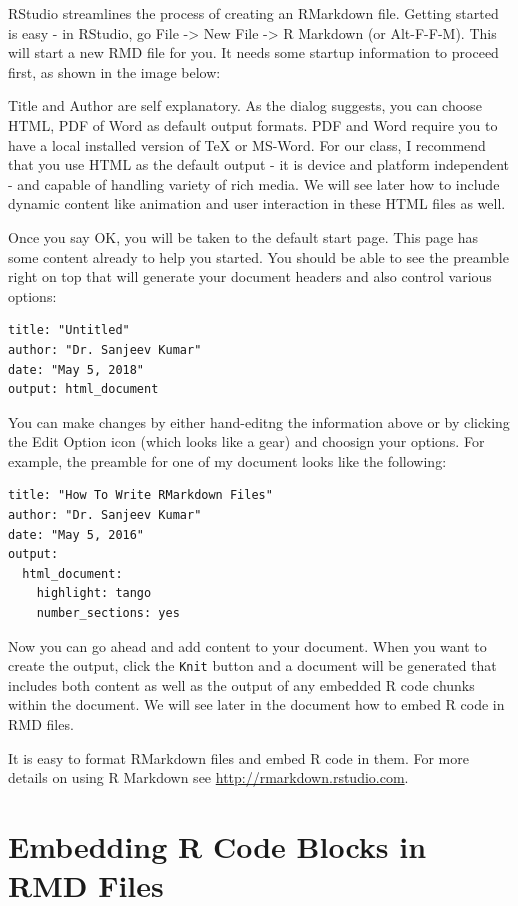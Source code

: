 \documentclass[]{krantz}
\theoremstyle{definition}
\theoremstyle{definition}
\theoremstyle{definition}
\theoremstyle{remark}
\begin{document}
RStudio streamlines the process of creating an RMarkdown file. Getting
started is easy - in RStudio, go File -\textgreater{} New File
-\textgreater{} R Markdown (or Alt-F-F-M). This will start a new RMD
file for you. It needs some startup information to proceed first, as
shown in the image below:

Title and Author are self explanatory. As the dialog suggests, you can
choose HTML, PDF of Word as default output formats. PDF and Word require
you to have a local installed version of TeX or MS-Word. For our class,
I recommend that you use HTML as the default output - it is device and
platform independent - and capable of handling variety of rich media. We
will see later how to include dynamic content like animation and user
interaction in these HTML files as well.

Once you say OK, you will be taken to the default start page. This page
has some content already to help you started. You should be able to see
the preamble right on top that will generate your document headers and
also control various options:

\begin{verbatim}
title: "Untitled"
author: "Dr. Sanjeev Kumar"
date: "May 5, 2018"
output: html_document
\end{verbatim}

You can make changes by either hand-editng the information above or by
clicking the Edit Option icon (which looks like a gear) and choosign
your options. For example, the preamble for one of my document looks
like the following:

\begin{verbatim}
title: "How To Write RMarkdown Files"
author: "Dr. Sanjeev Kumar"
date: "May 5, 2016"
output:
  html_document: 
    highlight: tango
    number_sections: yes
\end{verbatim}

Now you can go ahead and add content to your document. When you want to
create the output, click the \texttt{Knit} button and a document will be
generated that includes both content as well as the output of any
embedded R code chunks within the document. We will see later in the
document how to embed R code in RMD files.

It is easy to format RMarkdown files and embed R code in them. For more
details on using R Markdown see \url{http://rmarkdown.rstudio.com}.

\section{Embedding R Code Blocks in RMD
Files}\label{embedding-r-code-blocks-in-rmd-files}
\end{document}
